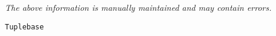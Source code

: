 \label{pkg:tuplebase}

{\tiny \it The above information is manually maintained and may contain errors.}
\begin{verbatim}
Tuplebase
\end{verbatim}
